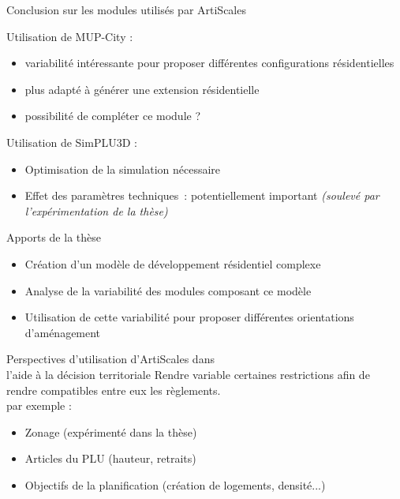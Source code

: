 \documentclass[xcolor=table]{beamer}
\begin{document}
\begin{frame}{Conclusion sur les modules utilisés par ArtiScales}
	\begin{block}{Utilisation de MUP-City :}
		\begin{itemize}
			\item variabilité intéressante pour proposer différentes configurations résidentielles
			\item plus adapté à générer une extension résidentielle
			\item possibilité de compléter ce module ? 			
		\end{itemize}
	\end{block}
	\begin{block}{Utilisation de SimPLU3D :}
		\begin{itemize}
			\item Optimisation de la simulation nécessaire
			\item Effet des paramètres techniques~: potentiellement important \textit{(soulevé par l'expérimentation de la thèse)}	\end{itemize}	
		\end{block}
\end{frame}
\begin{frame}{Apports de la thèse}
	\begin{itemize}
		\item Création d'un modèle de développement résidentiel complexe
		\item Analyse de la variabilité des modules composant ce modèle
		\item Utilisation de cette variabilité pour proposer différentes orientations d'aménagement
	\end{itemize}
\end{frame}

\begin{frame}{Perspectives d'utilisation d'ArtiScales dans \\l'aide à la décision territoriale}
	Rendre variable certaines restrictions afin de rendre compatibles entre eux les règlements.
	\\
	par exemple : 
	\begin{itemize}
		\item Zonage (expérimenté dans la thèse)
		\item Articles du PLU (hauteur, retraits)
		\item Objectifs de la planification (création de logements, densité...)
	\end{itemize}
\end{frame}
\end{document}
